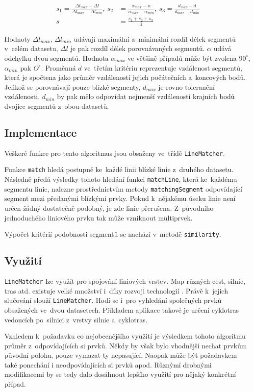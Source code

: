 \begin{equation}
 \begin{aligned}
 s_1 = \frac{ \Delta l_{max} - \Delta l }{ \Delta l_{max} - \Delta l_{min}},\ 
 s_2 &= \frac{ \alpha_{max} - \alpha }{ \alpha_{max} - \alpha_{min}},\ 
 s_3 = \frac{ d_{max} - d }{ d_{max} - d_{min}}\\
 s &= \frac{s_1+s_2+s_3}{3}
 \label{crit}
 \end{aligned}
\end{equation}

Hodnoty $\Delta l_{max}$, $\Delta l_{min}$ udávají maximální a~minimální rozdíl délek
segmentů v~celém datasetu, $\Delta l$ je pak rozdíl délek porovnávaných segmentů.
$\alpha$ udává odchylku dvou segmentů. Hodnota $\alpha_{max}$ ve většině případů může
být zvolena $90^{\circ}$, $\alpha_{min}$ pak $O^\circ$. Proměnná $d$ ve~třetím 
kritériu reprezentuje vzdálenost segmentů, která je spočtena jako průměr vzdáleností
jejich počátečních a~koncových bodů. Jelikož se porovnávají pouze blízké segmenty,
$d_{max}$ je rovno toleranční vzdálenosti, $d_{min}$ by pak mělo odpovídat nejmenší
vzdálenosti krajních bodů dvojice segmentů z~obou datasetů.


\subsection{Implementace} %
\label{lm-implementace}
Veškeré funkce pro tento algoritmus jsou obsaženy ve~třídě \texttt{Line\-Matcher}.

Funkce \texttt{match} hledá postupně ke~každé linii blízké linie z~druhého datasetu.
Následně předá výsledky tohoto hledání funkci \texttt{match\-Line}, která ke~každému
segmentu linie, nalezne prostřednictvím metody \texttt{matching\-Segment} odpovídající
segment mezi předanými blízkými prvky. Pokud k~nějakému úseku linie není určen
žádný dostatečně podobný, je zde linie přerušena. Z~původního jednoduchého liniového
prvku tak může vzniknout multiprvek. 

Výpočet kritérií podobnosti segmentů se nachází v~metodě \texttt{similarity}. 

\subsection{Využití}
\label{lm-vyuziti}

\texttt{LineMatcher} lze využít pro spojování liniových vrstev. Map různých cest, 
silnic, tras atd. existuje velké množství i~díky rozvoji technologií . 
Právě k~jejich slučování slouží \texttt{LineMatcher}. Hodí se i~pro vyhledání 
společných prvků obsažených ve~dvou datasetech. Příkladem aplikace takové je 
určení cyklotras vedoucích po~silnici z~vrstvy silnic a~cyklotras.  %

Vzhledem k~požadavku co nejobecnějšího využití je výsledkem tohoto algoritmu
průměr z~odpovídajících si prvků.  Někdy by však bylo vhodnější nechat prvkům
původní polohu, pouze vymazat ty nepasující. Naopak může být požadavkem také
ponechání i neodpovídajících si prvků apod. Různýmí drobnými modifikacemi
by se tedy dalo dosáhnout lepšího využití pro nějaký konkrétní případ.
